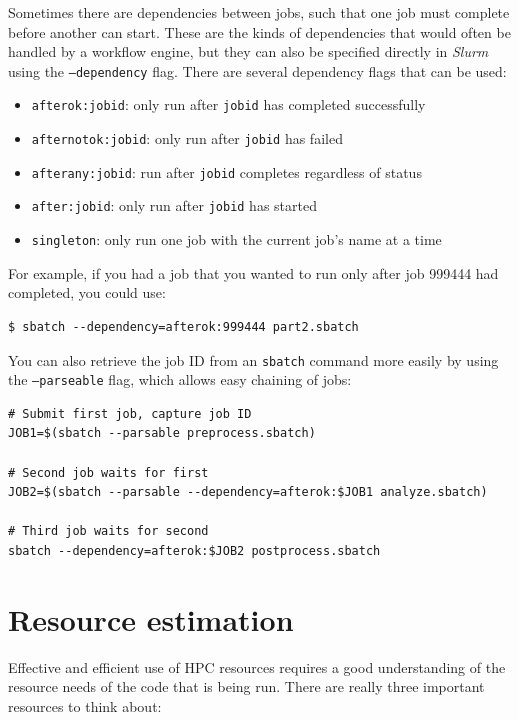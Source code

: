 Sometimes there are dependencies between jobs, such that one job must complete before another can start.  These are the kinds of dependencies that would often be handled by a workflow engine, but they can also be specified directly in \textit{Slurm} using the \texttt{--dependency} flag. There are several dependency flags that can be used:

\begin{itemize}
\item \texttt{afterok:jobid}: only run after \texttt{jobid} has completed successfully
\item \texttt{afternotok:jobid}: only run after \texttt{jobid} has failed
\item \texttt{afterany:jobid}: run after \texttt{jobid} completes regardless of status
\item \texttt{after:jobid}: only run after \texttt{jobid} has started
\item \texttt{singleton}: only run one job with the current job's name at a time
\end{itemize}

For example, if you had a job that you wanted to run only after job 999444 had completed, you could use:

\begin{lstlisting}[style=shellshort]
$ sbatch --dependency=afterok:999444 part2.sbatch
\end{lstlisting}

You can also retrieve the job ID from an \texttt{sbatch} command more easily by using the \texttt{--parseable} flag, which allows easy chaining of jobs:

\begin{lstlisting}[style=shell]
# Submit first job, capture job ID
JOB1=$(sbatch --parsable preprocess.sbatch)

# Second job waits for first
JOB2=$(sbatch --parsable --dependency=afterok:$JOB1 analyze.sbatch)

# Third job waits for second
sbatch --dependency=afterok:$JOB2 postprocess.sbatch
\end{lstlisting}

\section{Resource estimation}

Effective and efficient use of HPC resources requires a good understanding of the resource needs of the code that is being run. There are really three important resources to think about:

